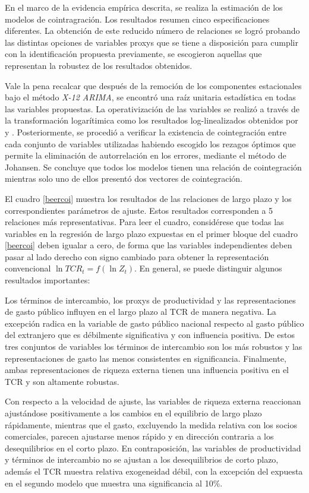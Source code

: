 \documentclass[12pt,letterpaper]{article}
\begin{document}
En el marco de la evidencia empírica descrita, se realiza la estimación de los modelos de cointragración. Los resultados resumen cinco especificaciones diferentes. La obtención de este reducido número de relaciones se logró probando las distintas opciones de variables proxys que se tiene a disposición para cumplir con la identificación propuesta previamente, se escogieron aquellas que representan la robustez de los resultados obtenidos.

Vale la pena recalcar que después de la remoción de los componentes estacionales bajo el método \emph{X-12 ARIMA}, se encontró una raíz unitaria estadística en todas las variables propuestas. La operativización de las variables se realizó a través de la transformación logarítimica como los resultados log-linealizados obtenidos por \cite{lane2004trans} y \cite{Obstfeld1995dynamics}. Posteriormente, se procedió a verificar la existencia de cointegración entre cada conjunto de variables utilizadas habiendo escogido los rezagos óptimos que permite la eliminación de autorrelación en los errores, mediante el método de Johansen. Se concluye que todos los modelos tienen una relación de cointegración mientras solo uno de ellos presentó dos vectores de cointegración.

El cuadro \ref{beercoi} muestra los resultados de las relaciones de largo plazo y los correspondientes parámetros de ajuste. Estos resultados corresponden a 5 relaciones más representativas. Para leer el cuadro, considérese que todas las variables en la regresión de largo plazo expuestas en el primer bloque del cuadro \ref{beercoi} deben igualar a cero, de forma que las variables independientes deben pasar al lado derecho con signo cambiado para obtener la representación convencional $\ln TCR_t=f(\ln Z_t)$. En general, se puede distinguir algunos resultados importantes:

Los términos de intercambio, los proxys de productividad y las representaciones de gasto público influyen en el largo plazo al TCR de manera negativa. La excepción radica en la variable de gasto público nacional respecto al gasto público del extranjero que es débilmente significativa y con influencia positiva. De estos tres conjuntos de variables los términos de intercambio son los más robustos y las representaciones de gasto las menos consistentes en significancia. Finalmente, ambas representaciones de riqueza externa tienen una influencia positiva en el TCR y son altamente robustas.

Con respecto a la velocidad de ajuste, las variables de riqueza externa reaccionan ajustándose positivamente a los cambios en el equilibrio de largo plazo rápidamente, mientras que el gasto, excluyendo la medida relativa con los socios comerciales, parecen ajustarse menos rápido y en dirección contraria a los desequilibrios en el corto plazo. En contraposición, las variables de productividad y términos de intercambio no se ajustan a los desequilibrios de corto plazo, además el TCR muestra relativa exogeneidad débil, con la excepción del expuesta en el segundo modelo que muestra una significancia al 10\%.
\end{document}
